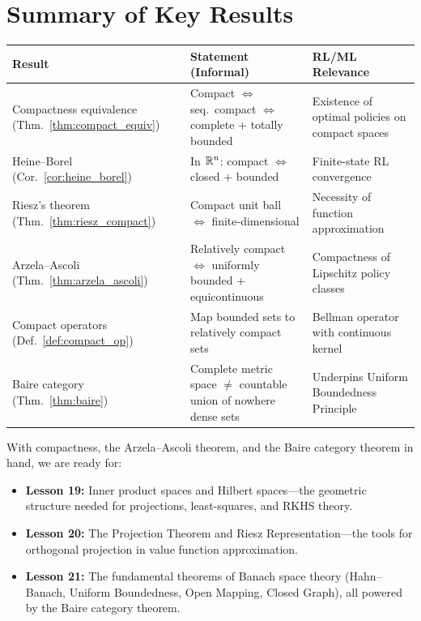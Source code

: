 \documentclass[11pt,a4paper]{article}
\begin{document}

\section{Summary of Key Results}
\label{sec:summary}

\begin{center}
\renewcommand{\arraystretch}{1.4}
\begin{tabular}{@{}p{4cm}p{5.8cm}p{4.5cm}@{}}
\toprule
\textbf{Result} & \textbf{Statement (Informal)} & \textbf{RL/ML Relevance} \\
\midrule
Compactness equivalence (Thm.~\ref{thm:compact_equiv})
  & Compact $\Leftrightarrow$ seq.\ compact $\Leftrightarrow$
    complete + totally bounded
  & Existence of optimal policies on compact spaces \\
Heine--Borel (Cor.~\ref{cor:heine_borel})
  & In $\mathbb{R}^n$: compact $\Leftrightarrow$ closed + bounded
  & Finite-state RL convergence \\
Riesz's theorem (Thm.~\ref{thm:riesz_compact})
  & Compact unit ball $\Leftrightarrow$ finite-dimensional
  & Necessity of function approximation \\
Arzela--Ascoli (Thm.~\ref{thm:arzela_ascoli})
  & Relatively compact $\Leftrightarrow$ uniformly bounded +
    equicontinuous
  & Compactness of Lipschitz policy classes \\
Compact operators (Def.~\ref{def:compact_op})
  & Map bounded sets to relatively compact sets
  & Bellman operator with continuous kernel \\
Baire category (Thm.~\ref{thm:baire})
  & Complete metric space $\ne$ countable union of nowhere
    dense sets
  & Underpins Uniform Boundedness Principle \\
\bottomrule
\end{tabular}
\end{center}

\bigskip

\begin{rlconnection}[title={Looking Ahead}]
With compactness, the Arzela--Ascoli theorem, and the Baire category theorem
in hand, we are ready for:
\begin{itemize}[nosep]
    \item \textbf{Lesson 19:} Inner product spaces and Hilbert spaces---the
          geometric structure needed for projections, least-squares, and
          RKHS theory.
    \item \textbf{Lesson 20:} The Projection Theorem and Riesz
          Representation---the tools for orthogonal projection in value
          function approximation.
    \item \textbf{Lesson 21:} The fundamental theorems of Banach space theory
          (Hahn--Banach, Uniform Boundedness, Open Mapping, Closed Graph),
          all powered by the Baire category theorem.
\end{itemize}
\end{rlconnection}


\end{document}
